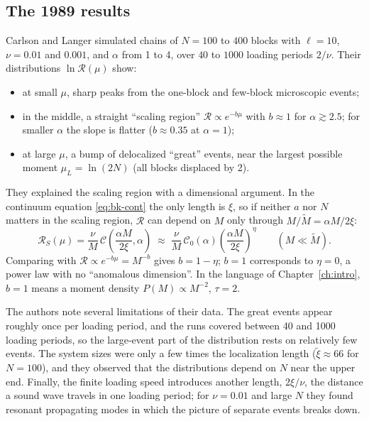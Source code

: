 \subsection{The 1989 results}

Carlson and Langer simulated chains of $N=100$ to $400$ blocks with $\ell=10$, $\nu=0.01$ and $0.001$, and $\alpha$ from 1 to 4, over $40$ to $1000$ loading
periods $2/\nu$. Their distributions $\ln\mathcal R(\mu)$ show:
\begin{itemize}[nosep]
  \item at small $\mu$, sharp peaks from the one-block and few-block microscopic events;
  \item in the middle, a straight ``scaling region'' $\mathcal R\propto e^{-b\mu}$ with $b\approx1$ for $\alpha\gtrsim2.5$; for smaller $\alpha$ the slope is
    flatter ($b\approx0.35$ at $\alpha=1$);
  \item at large $\mu$, a bump of delocalized ``great'' events, near the largest possible moment $\mu_L=\ln(2N)$ (all blocks displaced by 2).
\end{itemize}
They explained the scaling region with a dimensional argument. In the continuum equation \cref{eq:bk-cont} the only length is $\xi$, so if neither $a$ nor
$N$ matters in the scaling region, $\mathcal R$ can depend on $M$ only through $M/\tilde M = \alpha M/2\xi$:
\begin{equation}
  \mathcal R_S(\mu) = \frac{\nu}{M}\,\mathcal C\!\left(\frac{\alpha M}{2\xi},\alpha\right)
  \;\approx\; \frac{\nu}{M}\,\mathcal C_0(\alpha)\left(\frac{\alpha M}{2\xi}\right)^{\eta}\qquad (M\ll\tilde M).
\end{equation}
Comparing with $\mathcal R\propto e^{-b\mu} = M^{-b}$ gives $b = 1-\eta$; $b=1$ corresponds to $\eta=0$, a power law with no ``anomalous dimension''. In the language
of Chapter~\ref{ch:intro}, $b = 1$ means a moment density $P(M)\propto M^{-2}$, $\tau=2$.

The authors note several limitations of their data. The great events appear roughly once per loading period, and the runs covered between 40 and 1000 loading
periods, so the large-event part of the distribution rests on relatively few events. The system sizes were only a few times the localization length
($\tilde\xi\approx66$ for $N=100$), and they observed that the distributions depend on $N$ near the upper end. Finally, the finite loading speed introduces
another length, $2\xi/\nu$, the distance a sound wave travels in one loading period; for $\nu=0.01$ and large $N$ they found resonant propagating modes in which
the picture of separate events breaks down.

